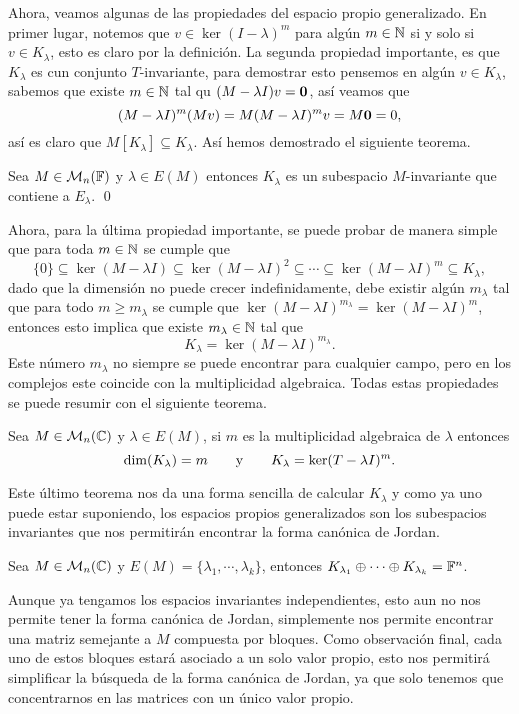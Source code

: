 Ahora, veamos algunas de las propiedades del espacio propio generalizado. En primer lugar, notemos que $v \in \ker(I-\lambda)^m$ para algún $m \in \mathbb{N}$ si y solo si $v \in K_\lambda$, esto es claro por la definición. La segunda propiedad importante, es que $K_\lambda$ es cun conjunto $T$-invariante, para demostrar esto pensemos en algún $v \in K_\lambda$, sabemos que existe $m\in\mathbb{N}$ tal qu $(M-\lambda I)v = \mathbf{0}$, así veamos que
\[ (M-\lambda I)^m (Mv) = M(M-\lambda I)^m v = M\mathbf{0} = 0,\]
así es claro que $M[K_\lambda] \subseteq K_\lambda$. Así hemos demostrado el siguiente teorema.

\begin{teor}
  Sea $M \in \mathcal{M}_n(\mathbb{F})$ y $\lambda \in E(M)$ entonces $K_\lambda$ es un subespacio $M$-invariante que contiene a $E_\lambda$. \qed
\end{teor}

Ahora, para la última propiedad importante, se puede probar de manera simple que para toda $m \in \mathbb{N}$ se cumple que
\[
  \{0\} \subseteq \ker(M-\lambda I) \subseteq \ker(M-\lambda I)^2 \subseteq \cdots \subseteq \ker(M-\lambda I)^m \subseteq K_\lambda,
\]
dado que la dimensión no puede crecer indefinidamente, debe existir algún $m_\lambda$ tal que para todo $m \geq m_\lambda$ se cumple que $\ker(M-\lambda I)^{m_\lambda} = \ker(M-\lambda I)^m$, entonces esto implica que existe $m_\lambda \in \mathbb{N}$ tal que
\[ K_\lambda = \ker(M-\lambda I)^{m_\lambda}.\]
Este número $m_\lambda$ no siempre se puede encontrar para cualquier campo, pero en los complejos este coincide con la multiplicidad algebraica. Todas estas propiedades se puede resumir con el siguiente teorema.

\begin{teor}
  Sea $M \in \mathcal{M}_n(\mathbb{C})$ y $\lambda \in E(M)$, si $m$ es la multiplicidad algebraica de $\lambda$ entonces
\[  \dim(K_{\lambda}) = m \qquad\text{y}\qquad K_\lambda = \ker(T-\lambda I)^m. \]
\end{teor}

Este último teorema nos da una forma sencilla de calcular $K_\lambda$ y como ya uno puede estar suponiendo, los espacios propios generalizados son los subespacios invariantes que nos permitirán encontrar la forma canónica de Jordan.

\begin{teor}
  Sea $M \in \mathcal{M}_n(\mathbb{C})$ y $E(M) = \{\lambda_1, \cdots, \lambda_k\}$, entonces $K_{\lambda_1} \oplus \cdots \oplus K_{\lambda_k} = \mathbb{F}^n$.
\end{teor}

Aunque ya tengamos los espacios invariantes independientes, esto aun no nos permite tener la forma canónica de Jordan, simplemente nos permite encontrar una matriz semejante a $M$ compuesta por bloques. Como observación final, cada uno de estos bloques estará asociado a un solo valor propio, esto nos permitirá simplificar la búsqueda de la forma canónica de Jordan, ya que solo tenemos que concentrarnos en las matrices con un único valor propio.

